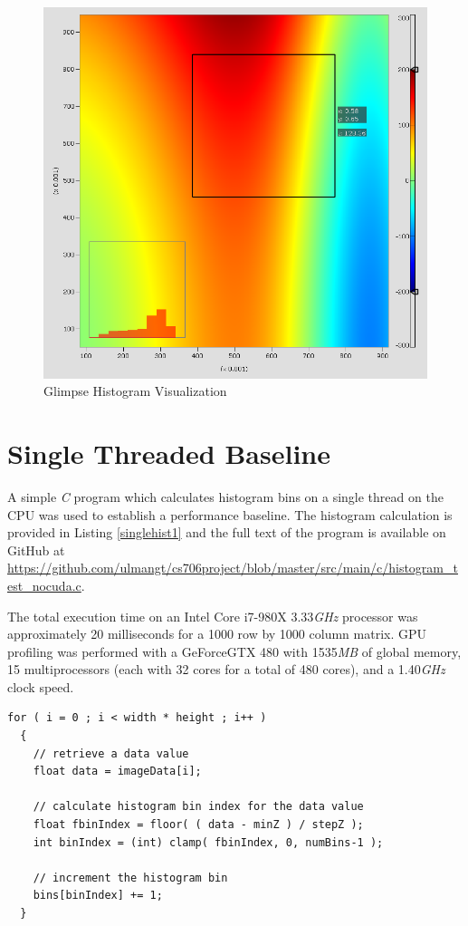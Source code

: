 \documentclass{article}
\begin{document}
\begin{figure}
\centering
\includegraphics[width=1.0\textwidth]{screenshots/glimpse/GlimpseHistogramPlot.png}
\caption{Glimpse Histogram Visualization}
\label{histogram1}
\end{figure}

\section{Single Threaded Baseline}\label{baseline}

A simple \emph{C} program which calculates histogram bins on a single thread on the CPU was used to establish a performance baseline. The histogram calculation is provided in Listing \ref{singlehist1} and the full text of the program is available on GitHub at \url{https://github.com/ulmangt/cs706project/blob/master/src/main/c/histogram_test_nocuda.c}.

The total execution time on an Intel Core i7-980X 3.33\emph{GHz} processor was approximately 20 milliseconds for a 1000 row by 1000 column matrix. GPU profiling was performed with a GeForceGTX 480 with 1535\emph{MB} of global memory, 15 multiprocessors (each with 32 cores for a total of 480 cores), and a 1.40\emph{GHz} clock speed\cite{geforce480}.

\lstset{language=C,basicstyle=\footnotesize}
\begin{minipage}{\textwidth}
\begin{lstlisting}[caption={Single Threaded Histogram Calculation},label={singlehist1}]
  for ( i = 0 ; i < width * height ; i++ )
  {
    // retrieve a data value
    float data = imageData[i];

    // calculate histogram bin index for the data value
    float fbinIndex = floor( ( data - minZ ) / stepZ );
    int binIndex = (int) clamp( fbinIndex, 0, numBins-1 );

    // increment the histogram bin
    bins[binIndex] += 1;
  }
\end{lstlisting}
\end{minipage}
\end{document}
